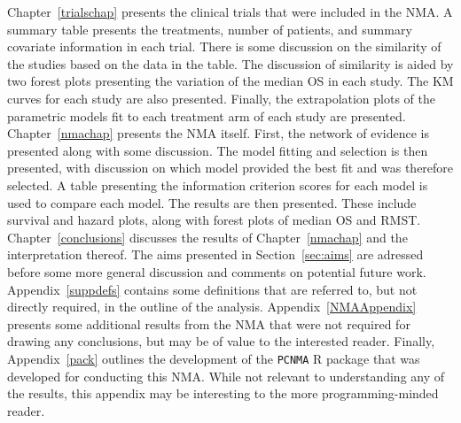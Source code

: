 Chapter~\ref{trialschap} presents the clinical trials that were included in the NMA. A summary table presents the treatments, number of patients, and summary covariate information in each trial. There is some discussion on the similarity of the studies based on the data in the table. The discussion of similarity is aided by two forest plots presenting the variation of the median OS in each study. The KM curves for each study are also presented. Finally, the extrapolation plots of the parametric models fit to each treatment arm of each study are presented. \\

Chapter~\ref{nmachap} presents the NMA itself. First, the network of evidence is presented along with some discussion. The model fitting and selection is then presented, with discussion on which model provided the best fit and was therefore selected. A table presenting the information criterion scores for each model is used to compare each model. The results are then presented. These include survival and hazard plots, along with forest plots of median OS and RMST. \\

Chapter~\ref{conclusions} discusses the results of Chapter~\ref{nmachap} and the interpretation thereof. The aims presented in Section~\ref{sec:aims} are adressed before some more general discussion and comments on potential future work. \\

Appendix~\ref{suppdefs} contains some definitions that are referred to, but not directly required, in the outline of the analysis. Appendix~\ref{NMAAppendix} presents some additional results from the NMA that were not required for drawing any conclusions, but may be of value to the interested reader. Finally, Appendix~\ref{pack} outlines the development of the \verb|PCNMA| R package that was developed for conducting this NMA. While not relevant to understanding any of the results, this appendix may be interesting to the more programming-minded reader.